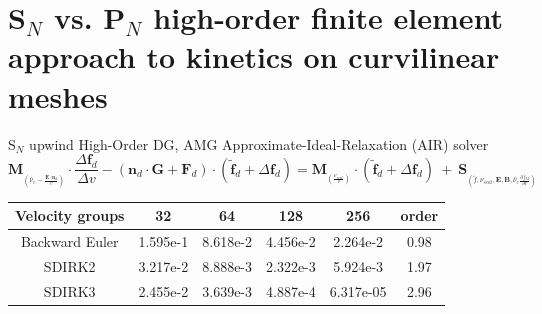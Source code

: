 \documentclass[8pt, compress]{beamer}
\newcommand{\pdv}[2]{\frac{\partial{#1}}{\partial{#2}}}
\newcommand{\vect}[1]{\boldsymbol{#1}}
\newcommand{\matr}[1]{\mathbf{#1}}
\newcommand{\nue}{\nu_{e}}
\newcommand{\nuscat}{\nu_{scat}}
\newcommand{\vmag}{v}
\newcommand{\vn}{\vect{n}}
\newcommand{\E}{\vect{E}}
\newcommand{\B}{\vect{B}}
\newcommand{\fM}{f_M}
\newcommand{\fzero}{f_0}
\begin{document}
\section{S$_N$ vs. P$_N$ high-order finite element approach to kinetics on curvilinear meshes}
\newcommand{\fs}{0.45}

\begin{frame}
\begin{center}
{\Large S$_N$ upwind High-Order DG, AMG Approximate-Ideal-Relaxation (AIR) solver
}
\begin{equation}
  \matr{M}_{_{(\tilde{\nue} - \frac{\E\cdot\vn_d}{\vmag})}}\cdot 
  \frac{\Delta \vect{f}_d}{\Delta \vmag}
  -   \left(\vn_d\cdot\matr{G} + \matr{F}_d\right) \cdot 
  \left(\tilde{\vect{f}}_d + \Delta \vect{f}_d\right) 
  =
  \matr{M}_{_{(\frac{\nuscat}{\vmag})}}\cdot 
  \left(\tilde{\vect{f}}_d + \Delta \vect{f}_d\right)
  ~+~ \vect{S}_{_{(\tilde{f}, \nuscat, \E, \B, \tilde{\nue}\pdv{\fM}{\vmag})}}
  \nonumber
\end{equation}

\begin{tabular}{c|ccccc}
    Velocity groups       & 32   & 64 & 128 & 256 & order \\
    \hline
	Backward Euler & 1.595e-1 & 8.618e-2 & 4.456e-2 & 2.264e-2 & 0.98 \\
    SDIRK2         & 3.217e-2 & 8.888e-3 & 2.322e-3 & 5.924e-3 & 1.97 \\
    SDIRK3         & 2.455e-2 & 3.639e-3 & 4.887e-4 & 6.317e-05 & 2.96 \\
\end{tabular}



\end{center}
\end{frame}
\end{document}
